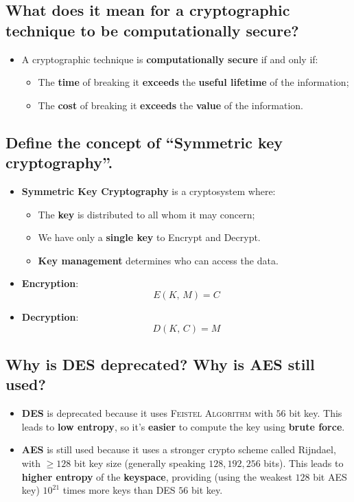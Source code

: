 \documentclass[9pt, letterpaper]{article}
\begin{document}
\subsection{What does it mean for a cryptographic technique to be computationally secure?}
\begin{itemize}
	\item A cryptographic technique is \textbf{computationally secure} if and only if:
	      \begin{itemize}
		      \item The \textbf{time} of breaking it \textbf{exceeds} the \textbf{useful lifetime} of the information;
		      \item The \textbf{cost} of breaking it \textbf{exceeds} the \textbf{value} of the information.
	      \end{itemize}
\end{itemize}

\subsection{Define the concept of “Symmetric key cryptography”.}
\begin{itemize}
	\item \textbf{Symmetric Key Cryptography} is a cryptosystem where:
	      \begin{itemize}
		      \item The \textbf{key} is distributed to all whom it may concern;
		      \item We have only a \textbf{single key} to Encrypt and Decrypt.
		      \item \textbf{Key management} determines who can access the data.
	      \end{itemize}
	\item \textbf{Encryption}: $$E(K \mbox{, }M) = C$$
	\item \textbf{Decryption}: $$D(K \mbox{, }C) = M$$
\end{itemize}


\subsection{Why is DES deprecated? Why is AES still used?}
\begin{itemize}
	\item \textbf{DES} is deprecated because it uses \textsc{Feistel Algorithm} with $56$ bit key. This leads to \textbf{low entropy}, so it's \textbf{easier} to compute the key using \textbf{brute force}.
	\item \textbf{AES} is still used because it uses a stronger crypto scheme called Rijndael, with $\ge 128$ bit key size (generally speaking $128,192,256$ bits). This leads to \textbf{higher entropy} of the \textbf{keyspace}, providing (using the weakest $128$ bit AES key) $10^{21}$ times more keys than DES $56$ bit key.
\end{itemize}
\end{document}
